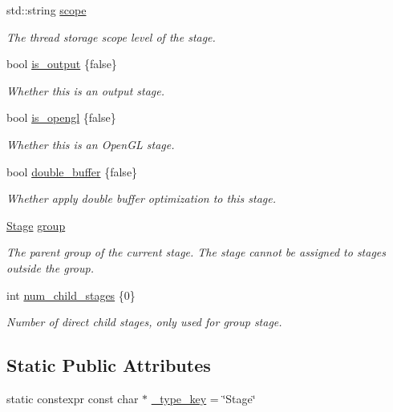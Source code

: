 \begin{DoxyCompactItemize}
std\+::string \hyperlink{classtvm_1_1te_1_1StageNode_a55acf027a39738cd1ddd063b27086038}{scope}
\begin{DoxyCompactList}\small\item\em The thread storage scope level of the stage. \end{DoxyCompactList}\item 
bool \hyperlink{classtvm_1_1te_1_1StageNode_af5cc9e6c2276cf8abde8f437f8bdbda4}{is\+\_\+output} \{false\}
\begin{DoxyCompactList}\small\item\em Whether this is an output stage. \end{DoxyCompactList}\item 
bool \hyperlink{classtvm_1_1te_1_1StageNode_a1c4533e83d0b9ae647f5f4dcd15e4208}{is\+\_\+opengl} \{false\}
\begin{DoxyCompactList}\small\item\em Whether this is an Open\+GL stage. \end{DoxyCompactList}\item 
bool \hyperlink{classtvm_1_1te_1_1StageNode_af5cb8c43f82eac4021fd06ab7c475f82}{double\+\_\+buffer} \{false\}
\begin{DoxyCompactList}\small\item\em Whether apply double buffer optimization to this stage. \end{DoxyCompactList}\item 
\hyperlink{classtvm_1_1te_1_1Stage}{Stage} \hyperlink{classtvm_1_1te_1_1StageNode_a02935c5eeeaa3ae794e971d449b5e377}{group}
\begin{DoxyCompactList}\small\item\em The parent group of the current stage. The stage cannot be assigned to stages outside the group. \end{DoxyCompactList}\item 
int \hyperlink{classtvm_1_1te_1_1StageNode_a98769dd08ea20c6d72f9abfe80d20090}{num\+\_\+child\+\_\+stages} \{0\}
\begin{DoxyCompactList}\small\item\em Number of direct child stages, only used for group stage. \end{DoxyCompactList}\end{DoxyCompactItemize}
\subsection*{Static Public Attributes}
\begin{DoxyCompactItemize}
\item 
static constexpr const char $\ast$ \hyperlink{classtvm_1_1te_1_1StageNode_af06a8dd105358f2c3aa5f65c8014f13f}{\+\_\+type\+\_\+key} = \char`\"{}Stage\char`\"{}
\end{DoxyCompactItemize}


